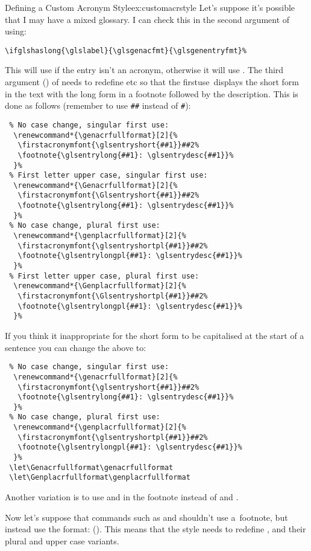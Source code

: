 \documentclass[report,inlinetitle]{nlctdoc}
\newcommand*{\firstuse}{\gls{firstuse}}
\begin{document}
\begin{example}{Defining a Custom Acronym Style}{ex:customacrstyle}
Let's suppose it's possible that I may have a mixed glossary. I can
check this in the second argument of  using:
\begin{verbatim}
\ifglshaslong{\glslabel}{\glsgenacfmt}{\glsgenentryfmt}%
\end{verbatim}
This will use  if the entry isn't an acronym,
otherwise it will use . The third argument
() of
 needs to redefine  etc 
so that the \firstuse\ displays the short form in the text with the 
long form in a footnote followed by the description. This is done as
follows (remember to use \verb|##| instead of \verb|#|):
\begin{verbatim}
 % No case change, singular first use:
  \renewcommand*{\genacrfullformat}[2]{%
   \firstacronymfont{\glsentryshort{##1}}##2%
   \footnote{\glsentrylong{##1}: \glsentrydesc{##1}}%
  }%
 % First letter upper case, singular first use: 
  \renewcommand*{\Genacrfullformat}[2]{%
   \firstacronymfont{\Glsentryshort{##1}}##2%
   \footnote{\glsentrylong{##1}: \glsentrydesc{##1}}%
  }%
 % No case change, plural first use:
  \renewcommand*{\genplacrfullformat}[2]{%
   \firstacronymfont{\glsentryshortpl{##1}}##2%
   \footnote{\glsentrylongpl{##1}: \glsentrydesc{##1}}%
  }%
 % First letter upper case, plural first use:
  \renewcommand*{\Genplacrfullformat}[2]{%
   \firstacronymfont{\Glsentryshortpl{##1}}##2%
   \footnote{\glsentrylongpl{##1}: \glsentrydesc{##1}}%
  }%
\end{verbatim}
If you think it inappropriate for the short form to be capitalised
at the start of a sentence you can change the above to:
\begin{verbatim}
 % No case change, singular first use:
  \renewcommand*{\genacrfullformat}[2]{%
   \firstacronymfont{\glsentryshort{##1}}##2%
   \footnote{\glsentrylong{##1}: \glsentrydesc{##1}}%
  }%
 % No case change, plural first use:
  \renewcommand*{\genplacrfullformat}[2]{%
   \firstacronymfont{\glsentryshortpl{##1}}##2%
   \footnote{\glsentrylongpl{##1}: \glsentrydesc{##1}}%
  }%
 \let\Genacrfullformat\genacrfullformat
 \let\Genplacrfullformat\genplacrfullformat
\end{verbatim}
Another variation is to use  and
 in the footnote instead of  and
.

Now let's suppose that commands such as  and
 shouldn't
use a~footnote, but instead use the format: 
().
This means that the style needs to redefine ,
 and their plural and upper case variants.


\end{example}
\end{document}
